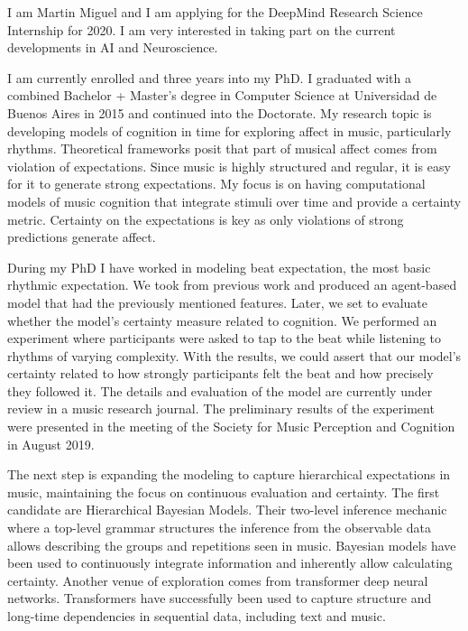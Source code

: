 I am Martin Miguel and I am applying for the DeepMind Research Science
Internship for 2020. I am very interested in taking part on the current
developments in AI and Neuroscience. 

I am currently enrolled and three years into my PhD. I graduated with a
combined Bachelor + Master's degree in Computer Science at Universidad de
Buenos Aires in 2015 and continued into the Doctorate. My research topic is
developing models of cognition in time for exploring affect in music,
particularly rhythms. Theoretical frameworks posit that part of musical affect
comes from violation of expectations. Since music is highly structured and
regular, it is easy for it to generate strong expectations. My focus is on
having computational models of music cognition that integrate stimuli over time
and provide a certainty metric. Certainty on the expectations is key as only
violations of strong predictions generate affect.

During my PhD I have worked in modeling beat expectation, the most basic
rhythmic expectation. We took from previous work and produced an agent-based
model that had the previously mentioned features.  Later, we set to evaluate
whether the model's certainty measure related to cognition. We performed an
experiment where participants were asked to tap to the beat while listening to
rhythms of varying complexity. With the results, we could assert that our
model's certainty related to how strongly participants felt the beat and how
precisely they followed it. The details and evaluation of the model are
currently under review in a music research journal. The preliminary results of
the experiment were presented in the meeting of the Society for Music
Perception and Cognition in August 2019. 

The next step is expanding the modeling to capture hierarchical expectations in
music, maintaining the focus on continuous evaluation and certainty. The first
candidate are Hierarchical Bayesian Models. Their two-level inference
mechanic where a top-level grammar structures the inference from the
observable data allows describing the groups and repetitions seen in music.
Bayesian models have been used to continuously integrate information and
inherently allow calculating certainty. Another venue of exploration comes from
transformer deep neural networks. Transformers have successfully been used to
capture structure and long-time dependencies in sequential data, including text
and music. 

